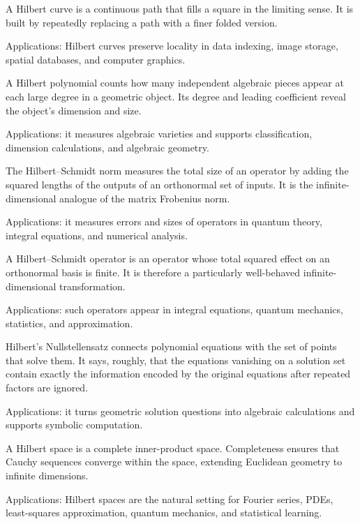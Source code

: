 A Hilbert curve is a continuous path that fills a square in the limiting sense. It is built by repeatedly replacing a path with a finer folded version. \par\noindent Applications: Hilbert curves preserve locality in data indexing, image storage, spatial databases, and computer graphics.

A Hilbert polynomial counts how many independent algebraic pieces appear at each large degree in a geometric object. Its degree and leading coefficient reveal the object's dimension and size. \par\noindent Applications: it measures algebraic varieties and supports classification, dimension calculations, and algebraic geometry.

The Hilbert--Schmidt norm measures the total size of an operator by adding the squared lengths of the outputs of an orthonormal set of inputs. It is the infinite-dimensional analogue of the matrix Frobenius norm. \par\noindent Applications: it measures errors and sizes of operators in quantum theory, integral equations, and numerical analysis.

A Hilbert--Schmidt operator is an operator whose total squared effect on an orthonormal basis is finite. It is therefore a particularly well-behaved infinite-dimensional transformation. \par\noindent Applications: such operators appear in integral equations, quantum mechanics, statistics, and approximation.

Hilbert's Nullstellensatz connects polynomial equations with the set of points that solve them. It says, roughly, that the equations vanishing on a solution set contain exactly the information encoded by the original equations after repeated factors are ignored. \par\noindent Applications: it turns geometric solution questions into algebraic calculations and supports symbolic computation.

A Hilbert space is a complete inner-product space. Completeness ensures that Cauchy sequences converge within the space, extending Euclidean geometry to infinite dimensions. \par\noindent Applications: Hilbert spaces are the natural setting for Fourier series, PDEs, least-squares approximation, quantum mechanics, and statistical learning.

